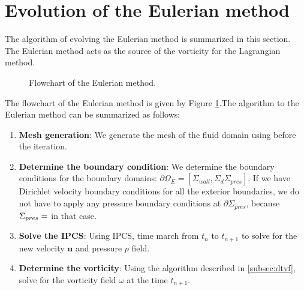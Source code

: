 
\section{Evolution of the Eulerian method}

The algorithm of evolving the Eulerian method is summarized in this section. The Eulerian method acts as the source of the vorticity for the Lagrangian method.

	\begin{figure}[!h]
		\centering
		\caption{Flowchart of the Eulerian method.}
		\label{fig:flowchart_eulerian}
	\end{figure}	
	
The flowchart of the Eulerian method is given by Figure \ref{fig:flowchart_eulerian}.The algorithm to the Eulerian method can be summarized as follows:
	\begin{enumerate}
	\item \textbf{Mesh generation}: We generate the mesh of the fluid domain using \gmsh before the iteration.
	\item \textbf{Determine the boundary condition}: We determine the boundary conditions for the boundary domains: $\partial \Omega_E = [\Sigma_{wall},\Sigma_{d} \Sigma_{pres}]$. If we have Dirichlet velocity boundary conditions for all the exterior boundaries, we do not have to apply any pressure boundary conditions at $\partial \Sigma_{pres}$, because $\Sigma_{pres}=\empty$ in that case.
	\item \textbf{Solve the IPCS}: Using IPCS, time march from $t_n$ to $t_{n+1}$ to solve for the new velocity $\mathbf{u}$ and pressure $p$ field.
	\item \textbf{Determine the vorticity}: Using the algorithm described in \ref{subsec:dtvf}, solve for the vorticity field $\omega$ at the time $t_{n+1}$. 
	\end{enumerate}
	
